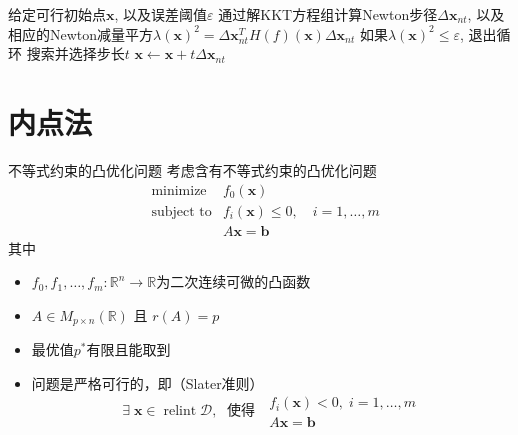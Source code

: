 
\begin{frame}

\begin{algorithm}[H]
\SetAlgoLined
\DontPrintSemicolon
{}

给定可行初始点$\mathbf{x}$, 以及误差阈值$\varepsilon$ \;
{
通过解KKT方程组计算Newton步径$\Delta \mathbf{x}_{nt}$, 以及相应的Newton减量平方$\lambda(\mathbf{x})^2 = \Delta \mathbf{x}_{nt}^T H(f)(\mathbf{x}) \Delta \mathbf{x}_{nt}$\;
如果$\lambda(\mathbf{x})^2 \le \varepsilon$, 退出循环 \;
搜索并选择步长$t$ \;
$ \mathbf{x} \gets \mathbf{x} + t \Delta \mathbf{x}_{nt}$ \;
}
\caption{等式约束问题的Newton法}
\end{algorithm}

\end{frame}


\section{内点法}


\begin{frame}

\begin{block}{不等式约束的凸优化问题}
考虑含有不等式约束的凸优化问题
\begin{eqnarray*}
& \text{minimize} & f_0(\mathbf{x}) \\
& \text{subject to} & f_i(\mathbf{x}) \le 0, \quad i = 1,\ldots,m \\
& & A\mathbf{x} = \mathbf{b}
\end{eqnarray*}
其中
\begin{itemize}
\item $f_0,f_1,\ldots,f_m: \mathbb{R}^n \to \mathbb{R}$为二次连续可微的凸函数
\item $A \in M_{p\times n}(\mathbb{R})$ 且 $r(A) = p$
\item 最优值$p^*$有限且能取到
\item 问题是严格可行的，即（Slater准则）
$$\exists \; \mathbf{x} \in \operatorname{relint} \mathcal{D}, \; \text{ 使得 }\; 
\begin{array}{l}
f_i(\mathbf{x}) < 0, \; i = 1,\ldots,m \\
A\mathbf{x} = \mathbf{b}
\end{array}$$
\end{itemize}
\end{block}

\end{frame}

